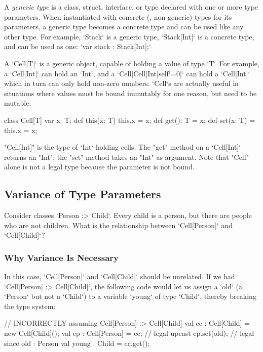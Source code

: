 {
A {\em generic type} is a class, struct,  interface, or type declared with one or
more type parameters.  When instantiated with concrete (\viz, non-generic)
types for its parameters, a generic type becomes a concrete type and can be
used like any other type. For example,
\xcd`Stack` is a generic type, 
\xcd`Stack[Int]` is a concrete type, and can be used as one: 
\xcd`var stack : Stack[Int];`


A \xcd`Cell[T]` is a generic object, capable of holding a value of type
\xcd`T`.  For example, a \xcd`Cell[Int]` can hold an \xcd`Int`, and a
\xcd`Cell[Cell[Int]{self!=0}]` can hold a \xcd`Cell[Int]` which in turn can
only hold non-zero numbers.  \xcd`Cell`s are actually useful in situations
where values must be bound immutably for one reason, but need to be mutable.
\begin{xten}
class Cell[T] {
    var x: T;
    def this(x: T) { this.x = x; }
    def get(): T = x;
    def set(x: T) = { this.x = x; }
}
\end{xten}


\xcd"Cell[Int]" is the type of \xcd`Int`-holding cells.  
The \xcd"get" method on a \xcd`Cell[Int]` returns an \xcd"Int"; the
\xcd"set" method takes an \xcd"Int" as argument.  Note that
\xcd"Cell" alone is not a legal type because the parameter is
not bound.

\subsection{Variance of Type Parameters}

Consider classes \xcd`Person :> Child`.  Every child is a person, but there
are people who are not children.  What is the relationship between
\xcd`Cell[Person]` and \xcd`Cell[Child]`?  

\subsubsection{Why Variance Is Necessary}

In this case, \xcd`Cell[Person]` and \xcd`Cell[Child]` should be unrelated.  
If we had \xcd`Cell[Person] :> Cell[Child]`, the following code would let us
assign a \xcd`old` (a \xcd`Person` but not a \xcd`Child`) to a
variable \xcd`young` of type \xcd`Child`, thereby breaking the type system: 
\begin{xten}
// INCORRECTLY assuming Cell[Person] :> Cell[Child]
val cc : Cell[Child] = new Cell[Child]();
val cp : Cell[Person] = cc; // legal upcast
cp.set(old);       // legal since old : Person
val young : Child = cc.get(); 
\end{xten}

}
